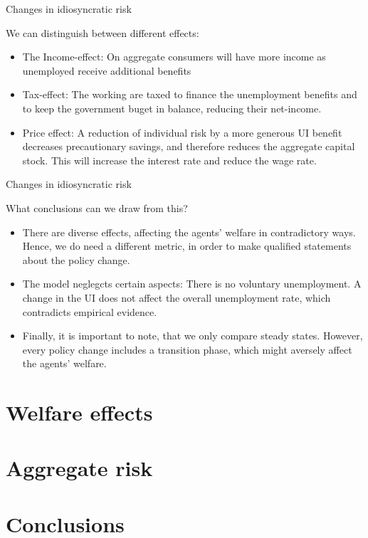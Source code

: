 \documentclass{beamer}
\begin{document}
\begin{frame}{Changes in idiosyncratic risk}

	
We can distinguish between different effects: 

	\begin{itemize}
	\item {
The Income-effect: On aggregate consumers will have more income as unemployed receive additional benefits

	}	
	\item {
Tax-effect: The working are taxed to finance the unemployment benefits and to keep the government buget in balance, reducing their net-income. 

	}	
	\item {
Price effect: A reduction of individual risk by a more generous UI benefit decreases precautionary savings, and therefore reduces the aggregate capital stock. This will increase the interest rate and reduce the wage rate.
	}	

	\end{itemize} 
\end{frame}

\begin{frame}{Changes in idiosyncratic risk}
	
What conclusions can we draw from this?  

	\begin{itemize}
	\item {
There are diverse effects, affecting the agents' welfare in contradictory ways. Hence, we do need a different metric, in order to make qualified statements about the policy change. 
	}	
	\item {
The model neglegcts certain aspects: There is no voluntary unemployment. A change in the UI does not affect the overall unemployment rate, which contradicts empirical evidence. 
	}	
	\item {
Finally, it is important to note, that we only compare steady states. However, every policy change includes a transition phase, which might aversely affect the agents' welfare. 
	}	


	\end{itemize} 
\end{frame}


\section{Welfare effects}
\subsection{}


\section{Aggregate risk}
\subsection{}

\section{Conclusions}
\subsection{}
\end{document}
